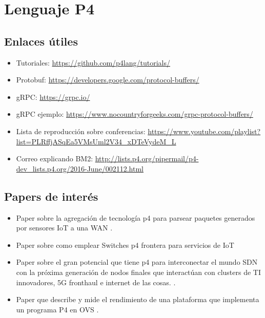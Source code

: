 \chapter{Lenguaje P4}
\section{Enlaces útiles}
\begin{itemize}
    \item Tutoriales: \url{https://github.com/p4lang/tutorials/}
    \item Protobuf: \url{https://developers.google.com/protocol-buffers/}
    \item gRPC: \url{https://grpc.io/}
    \item gRPC ejemplo: \url{https://www.nocountryforgeeks.com/grpc-protocol-buffers/}
    \item Lista de reproducción sobre conferencias: \newline 
    \url{https://www.youtube.com/playlist?list=PLRffjASqEa5VMsUml2V34_xDTeVydeM_L}
    \item Correo explicando BM2: \url{http://lists.p4.org/pipermail/p4-dev_lists.p4.org/2016-June/002112.html}
    
\end{itemize}
\section{Papers de interés}
\begin{itemize}
    \item Paper sobre la agregación de tecnología p4 para parsear paquetes generados por sensores IoT a una WAN \cite{p4_iot-paper}.
    \item Paper sobre como emplear Switches p4 frontera para servicios de IoT \cite{8470257}
    \item Paper sobre el gran potencial que tiene p4 para interconectar el mundo SDN con la próxima generación de nodos finales que interactúan con clusters de TI innovadores, 5G fronthaul e internet de las cosas. \cite{8651200}.
    \item Paper que describe y mide el rendimiento de una plataforma que implementa un programa P4 en OVS \cite{Shahbaz:2016:PPP:2934872.2934886}.
    
\end{itemize}

